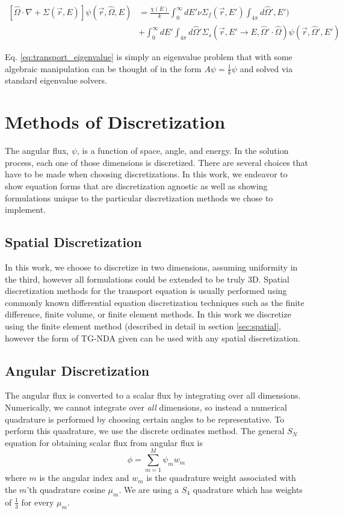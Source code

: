 \begin{equation}
    \label{eq:transport_eigenvalue}
    \begin{split}
        [\hat{\Omega} \cdot \nabla + \Sigma(\vec{r}, E)]\psi(\vec{r}, \hat{\Omega}, E) &= \frac{\chi(E)}{k} \int_0^\infty dE' \nu \Sigma_{f}(\vec{r}, E') \int_{4\pi} d\hat{\Omega}', E') \\ &+ \int_0^\infty dE' \int_{4\pi} d\hat{\Omega}' \Sigma_s(\vec{r}, E' \rightarrow E, \hat{\Omega}' \cdot \hat{\Omega})\psi(\vec{r}, \hat{\Omega}', E') 
    \end{split}
\end{equation}

Eq. \ref{eq:transport_eigenvalue} is simply an eigenvalue problem that with some algebraic manipulation can be thought of in the form $A\psi = \frac{1}{k} \psi$ and solved via standard eigenvalue solvers. 

\section{Methods of Discretization}
The angular flux, $\psi$, is a function of space, angle, and energy. In the solution process, each one of those dimensions is discretized. There are several choices that have to be made when choosing discretizations. In this work, we endeavor to show equation forms that are discretization agnostic as well as showing formulations unique to the particular discretization methods we chose to implement. 
\subsection{Spatial Discretization}
In this work, we choose to discretize in two dimensions, assuming uniformity in the third, however all formulations could be extended to be truly 3D. Spatial discretization methods for the transport equation is usually performed using commonly known differential equation discretization techniques such as the finite difference, finite volume, or finite element methods. In this work we discretize using the finite element method (described in detail in section \ref{sec:spatial}, however the form of TG-NDA given can be used with any spatial discretization. 

\subsection{Angular Discretization}
The angular flux is converted to a scalar flux by integrating over all dimensions. Numerically, we cannot integrate over \textit{all} dimensions, so instead a numerical quadrature is performed by choosing certain angles to be representative.  To perform this quadrature, we use the discrete ordinates method. The general $S_N$ equation for obtaining scalar flux from angular flux is
\begin{equation}
    \phi = \sum\limits_{m=1}^{M}\psi_m w_m
\end{equation}
where $m$ is the angular index and $w_m$ is the quadrature weight associated with the $m$'th quadrature cosine $\mu_m$. We are using a $S_4$ quadrature which has weights of $\frac{1}{3}$ for every $\mu_m$.

